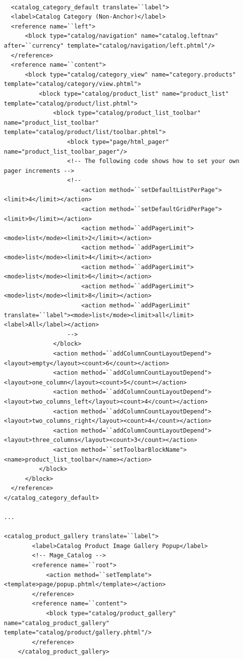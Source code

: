 \vspace{0.5cm}
\lstset{language=XML}
\begin{lstlisting} 

  <catalog_category_default translate=``label">
  <label>Catalog Category (Non-Anchor)</label>
  <reference name=``left">
      <block type="catalog/navigation" name="catalog.leftnav" after=``currency" template="catalog/navigation/left.phtml"/>
  </reference>
  <reference name=``content">
      <block type="catalog/category_view" name="category.products" template="catalog/category/view.phtml">
          <block type="catalog/product_list" name="product_list" template="catalog/product/list.phtml">
              <block type="catalog/product_list_toolbar" name="product_list_toolbar" template="catalog/product/list/toolbar.phtml">
                  <block type="page/html_pager" name="product_list_toolbar_pager"/>
                  <!-- The following code shows how to set your own pager increments -->
                  <!--
                      <action method=``setDefaultListPerPage"><limit>4</limit></action>
                      <action method=``setDefaultGridPerPage"><limit>9</limit></action>
                      <action method=``addPagerLimit"><mode>list</mode><limit>2</limit></action>
                      <action method=``addPagerLimit"><mode>list</mode><limit>4</limit></action>
                      <action method=``addPagerLimit"><mode>list</mode><limit>6</limit></action>
                      <action method=``addPagerLimit"><mode>list</mode><limit>8</limit></action>
                      <action method=``addPagerLimit" translate=``label"><mode>list</mode><limit>all</limit><label>All</label></action>
                  -->
              </block>
              <action method=``addColumnCountLayoutDepend"><layout>empty</layout><count>6</count></action>
              <action method=``addColumnCountLayoutDepend"><layout>one_column</layout><count>5</count></action>
              <action method=``addColumnCountLayoutDepend"><layout>two_columns_left</layout><count>4</count></action>
              <action method=``addColumnCountLayoutDepend"><layout>two_columns_right</layout><count>4</count></action>
              <action method=``addColumnCountLayoutDepend"><layout>three_columns</layout><count>3</count></action>
              <action method=``setToolbarBlockName"><name>product_list_toolbar</name></action>
          </block>
      </block>
  </reference>
</catalog_category_default>

...

<catalog_product_gallery translate=``label">
        <label>Catalog Product Image Gallery Popup</label>
        <!-- Mage_Catalog -->
        <reference name=``root">
            <action method=``setTemplate"><template>page/popup.phtml</template></action>
        </reference>
        <reference name=``content">
            <block type="catalog/product_gallery" name="catalog_product_gallery" template="catalog/product/gallery.phtml"/>
        </reference>
    </catalog_product_gallery>


\end{lstlisting}
\vspace{0.5cm}

